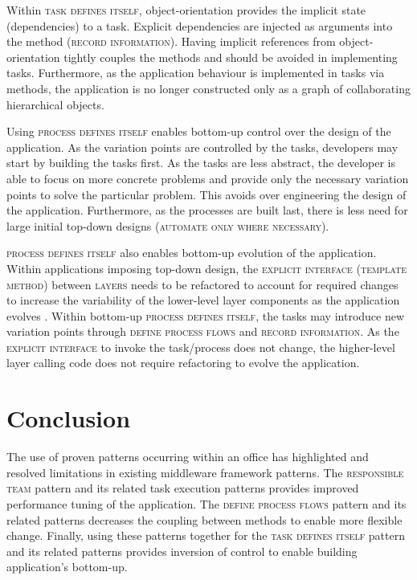 \documentclass[prodmode]{style/acmlarge}
\begin{document}
Within \textsc{task defines itself}, object-orientation provides the implicit
state (dependencies) to a task.  Explicit dependencies are injected as arguments
into the method (\textsc{record information}).  Having implicit references from
object-orientation tightly couples the methods and should be avoided in
implementing tasks.  Furthermore, as the application behaviour is implemented in
tasks via methods, the application is no longer constructed only as a graph of
collaborating hierarchical objects.

Using \textsc{process defines itself} enables bottom-up control over the design
of the application.  As the variation points are controlled by the tasks,
developers may start by building the tasks first.  As the tasks are less
abstract, the developer is able to focus on more concrete problems and provide
only the necessary variation points to solve the particular problem.  This
avoids over engineering the design of the application.  Furthermore, as the
processes are built last, there is less need for large initial top-down designs
(\textsc{automate only where necessary}).

\textsc{process defines itself} also enables bottom-up evolution of the
application.  Within applications imposing top-down design, the
\textsc{explicit interface} (\textsc{template method}) between \textsc{layers}
needs to be refactored to account for required changes to increase the
variability of the lower-level layer components as the application evolves
\cite{ioc}.  Within bottom-up \textsc{process defines itself}, the tasks may
introduce new variation points through \textsc{define process flows} and
\textsc{record information}.  As the \textsc{explicit interface} to invoke the
task/process does not change, the higher-level layer calling code does not
require refactoring to evolve the application.




\section{Conclusion}

The use of proven patterns occurring within an office has highlighted and
resolved limitations in existing middleware framework patterns.  The
\textsc{responsible team} pattern and its related task execution patterns
provides improved performance tuning of the application.  The \textsc{define
process flows} pattern and its related patterns decreases the coupling between
methods to enable more flexible change.  Finally, using these patterns together
for the \textsc{task defines itself} pattern and its related patterns provides
inversion of control to enable building application's bottom-up.
\end{document}
